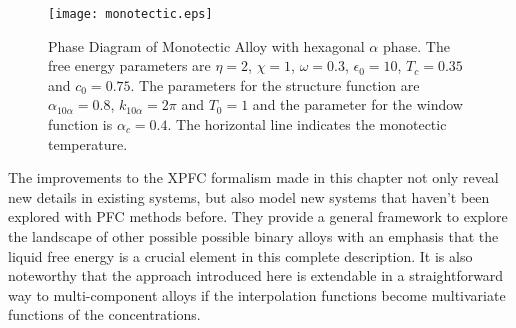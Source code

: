 \begin{figure}
    \centering
	\texttt{[image: monotectic.eps]}
    \caption[Monotectic Phase Diagram]{
        \label{monotectic} Phase Diagram of Monotectic Alloy with hexagonal
        $\alpha$ phase. The free energy parameters are $\eta = 2$, $\chi=1$,
        $\omega=0.3$, $\epsilon_0 = 10$, $T_c = 0.35$ and $c_0 = 0.75$. The
        parameters for the structure function are $\alpha_{10\alpha} = 0.8$,
        $k_{10\alpha} = 2\pi$ and $T_0 = 1$ and the parameter for the window
        function is $\alpha_c = 0.4$. The horizontal line indicates the 
        monotectic temperature.
    }
\end{figure}

The improvements to the XPFC formalism made in this chapter not only reveal new
details in existing systems, but also model new systems that haven't been
explored with PFC methods before. They provide a general framework to explore
the landscape of other possible possible binary alloys with an emphasis that
the liquid free energy is a crucial element in this complete description. It is
also noteworthy that the approach introduced here is extendable in a
straightforward way to multi-component alloys if the interpolation functions
become multivariate functions of the concentrations.

